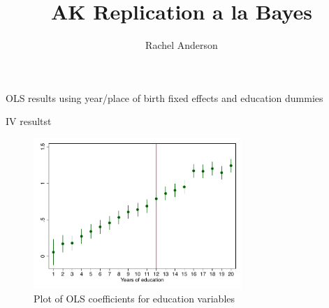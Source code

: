 \documentclass{article}
\let\estinput=%
\newcommand{\estauto}[3]{
		\vspace{.75ex}{
			\begin{tabular}{l*{#2}{#3}}
			\toprule
			\estinput{#1}
			\bottomrule
			\addlinespace[.75ex]
			\end{tabular}
			}
		}
\begin{document}
\title{AK Replication a la Bayes}
\author{Rachel Anderson}

\maketitle

\begin{table}
\centering
\caption{OLS results using year/place of birth fixed effects and education dummies}
\label{table1}
\end{table}

\begin{table}
\centering
\caption{IV resultst}
\label{table1}
\end{table}


\begin{figure}[h!]
\centering
\includegraphics[width=0.7\textwidth]{../Figures/coefplot_ols.pdf}
\caption{Plot of OLS coefficients for education variables}
\end{figure}
\end{document}
